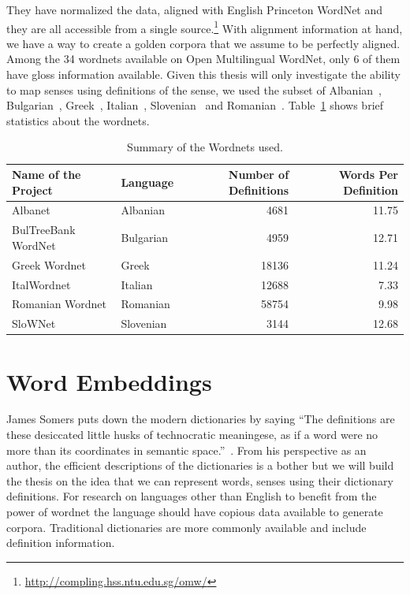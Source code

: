 They have normalized the data, aligned with English Princeton WordNet and they are all accessible from a single source.\footnote{\url{http://compling.hss.ntu.edu.sg/omw/}}
With alignment information at hand, we have a way to create a golden corpora that we assume to be perfectly aligned.
Among the 34 wordnets available on Open Multilingual WordNet, only 6 of them have gloss information available.
Given this thesis will only investigate the ability to map senses using definitions of the sense, we used the subset of Albanian~\cite{ruci_current_2008}, Bulgarian~\cite{simov_constructing_2010}, Greek~\cite{stamou_exploring_2004}, Italian~\cite{pianta_multiwordnet_2002}, Slovenian~\cite{fiser_slownet_2012} and Romanian~\cite{tufis_romanian_2008}.
Table~\ref{tab:summary_table} shows brief statistics about the wordnets.

\begin{table}[!hbp]
    \begin{center}
        \caption{Summary of the Wordnets used.}\label{tab:summary_table}
        \begin{tabular}{llrr}
            \toprule%
            \textbf{Name of the Project} & \textbf{Language} & \textbf{Number of Definitions} & \textbf{Words Per Definition} \\
            \midrule%
            Albanet & Albanian & 4681 & 11.75 \\
            BulTreeBank WordNet & Bulgarian & 4959 & 12.71 \\
            Greek Wordnet & Greek & 18136 & 11.24 \\
            ItalWordnet & Italian & 12688 & 7.33 \\
            Romanian Wordnet & Romanian & 58754 & 9.98 \\
            SloWNet & Slovenian & 3144 & 12.68 \\
            \bottomrule %
        \end{tabular}
    \end{center}
\end{table}

\section{Word Embeddings}%
\label{sec:word_embeddings}
James Somers puts down the modern dictionaries by saying \enquote{The definitions are these desiccated little husks of technocratic meaningese, as if a word were no more than its coordinates in semantic space.}~\cite{somers_youre_2014}.
From his perspective as an author, the efficient descriptions of the dictionaries is a bother but we will build the thesis on the idea that we can represent words, senses using their dictionary definitions.
For research on languages other than English to benefit from the power of wordnet the language should have copious data available to generate corpora.
Traditional dictionaries are more commonly available and include definition information.


